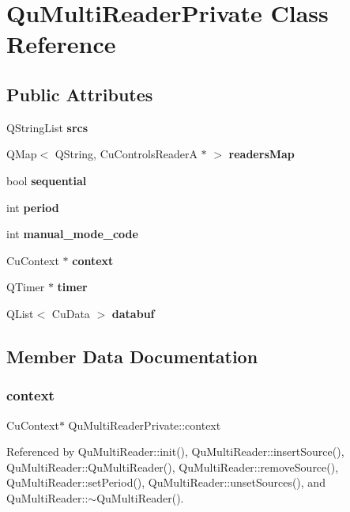 \section{Qu\+Multi\+Reader\+Private Class Reference}
\label{classQuMultiReaderPrivate}
\subsection*{Public Attributes}
\begin{DoxyCompactItemize}
\item 
Q\+String\+List \textbf{ srcs}
\item 
Q\+Map$<$ Q\+String, Cu\+Controls\+ReaderA $\ast$ $>$ \textbf{ readers\+Map}
\item 
bool \textbf{ sequential}
\item 
int \textbf{ period}
\item 
int \textbf{ manual\+\_\+mode\+\_\+code}
\item 
Cu\+Context $\ast$ \textbf{ context}
\item 
Q\+Timer $\ast$ \textbf{ timer}
\item 
Q\+List$<$ Cu\+Data $>$ \textbf{ databuf}
\end{DoxyCompactItemize}


\subsection{Member Data Documentation}
\mbox{\label{classQuMultiReaderPrivate_a368d1b37573fa164e132891a5409a763}} 
\subsubsection{context}
{\footnotesize\ttfamily Cu\+Context$\ast$ Qu\+Multi\+Reader\+Private\+::context}



Referenced by Qu\+Multi\+Reader\+::init(), Qu\+Multi\+Reader\+::insert\+Source(), Qu\+Multi\+Reader\+::\+Qu\+Multi\+Reader(), Qu\+Multi\+Reader\+::remove\+Source(), Qu\+Multi\+Reader\+::set\+Period(), Qu\+Multi\+Reader\+::unset\+Sources(), and Qu\+Multi\+Reader\+::$\sim$\+Qu\+Multi\+Reader().

\mbox{\label{classQuMultiReaderPrivate_a7dfb33cc3f2a5280ecfe760d6f6d38bf}} 

